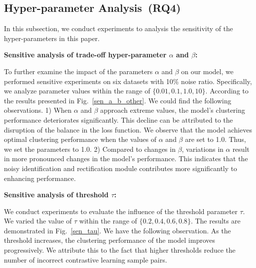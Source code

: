 \documentclass{article}
\theoremstyle{plain}
\theoremstyle{definition}
\theoremstyle{remark}
\begin{document}
\subsection{Hyper-parameter Analysis~\textbf{(RQ4)}}\label{rq4}
In this subsection, we conduct experiments to analysis the sensitivity of the hyper-parameters in this paper. 

\textbf{Sensitive analysis of trade-off hyper-parameter $\alpha$ and $\beta$:}

To further examine the impact of the parameters $\alpha$ and $\beta$ on our model, we performed sensitive experiments on six datasets with 10\% noise ratio. Specifically, we analyze parameter values within the range of $\{0.01, 0.1, 1.0, 10\}$. According to the results presented in Fig.~\ref{sen_a_b_other}. We could find the following observations. 1) When $\alpha$ and $\beta$ approach extreme values, the model's clustering performance deteriorates significantly. This decline can be attributed to the disruption of the balance in the loss function. We observe that the model achieves optimal clustering performance when the values of $\alpha$ and $\beta$ are set to 1.0. Thus, we set the parameters to 1.0. 2) Compared to changes in $\beta$, variations in $\alpha$ result in more pronounced changes in the model's performance. This indicates that the noisy identification and rectification module contributes more significantly to enhancing performance.









\textbf{Sensitive analysis of threshold $\tau$:}

We conduct experiments to evaluate the influence of the threshold parameter $\tau$. We varied the value of $\tau$ within the range of $\{0.2, 0.4, 0.6, 0.8\}$. The results are demonstrated in Fig.~\ref{sen_tau}. We have the following observation. As the threshold increases, the clustering performance of the model improves progressively. We attribute this to the fact that higher thresholds reduce the number of incorrect contrastive learning sample pairs.

\end{document}
